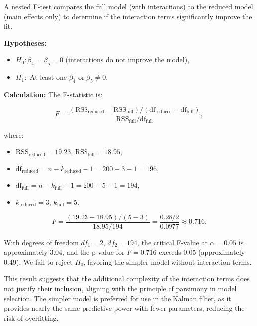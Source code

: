 \documentclass[12pt]{article}
\begin{document}
A nested F-test compares the full model (with interactions) to the reduced model (main effects only) to determine if the interaction terms significantly improve the fit.

\textbf{Hypotheses:}
\begin{itemize}
    \item \( H_0: \beta_4 = \beta_5 = 0 \) (interactions do not improve the model),
    \item \( H_1: \) At least one \( \beta_4 \) or \( \beta_5 \neq 0 \).
\end{itemize}

\textbf{Calculation:}
The F-statistic is:

\begin{equation}
    F = \frac{(\text{RSS}_{\text{reduced}} - \text{RSS}_{\text{full}}) / (\text{df}_{\text{reduced}} - \text{df}_{\text{full}})}{\text{RSS}_{\text{full}} / \text{df}_{\text{full}}},
    \label{eq:f_statistic}
\end{equation}

where:
\begin{itemize}
    \item \( \text{RSS}_{\text{reduced}} = 19.23 \), \( \text{RSS}_{\text{full}} = 18.95 \),
    \item \( \text{df}_{\text{reduced}} = n - k_{\text{reduced}} - 1 = 200 - 3 - 1 = 196 \),
    \item \( \text{df}_{\text{full}} = n - k_{\text{full}} - 1 = 200 - 5 - 1 = 194 \),
    \item \( k_{\text{reduced}} = 3 \), \( k_{\text{full}} = 5 \).
\end{itemize}

\begin{equation}
    F = \frac{(19.23 - 18.95) / (5 - 3)}{18.95 / 194} = \frac{0.28 / 2}{0.0977} \approx 0.716.
    \label{eq:f_calculation}
\end{equation}

With degrees of freedom \( df_1 = 2 \), \( df_2 = 194 \), the critical F-value at \( \alpha = 0.05 \) is approximately 3.04, and the p-value for \( F = 0.716 \) exceeds 0.05 (approximately 0.49). We fail to reject \( H_0 \), favoring the simpler model without interaction terms.

This result suggests that the additional complexity of the interaction terms does not justify their inclusion, aligning with the principle of parsimony in model selection. The simpler model is preferred for use in the Kalman filter, as it provides nearly the same predictive power with fewer parameters, reducing the risk of overfitting.
\end{document}
